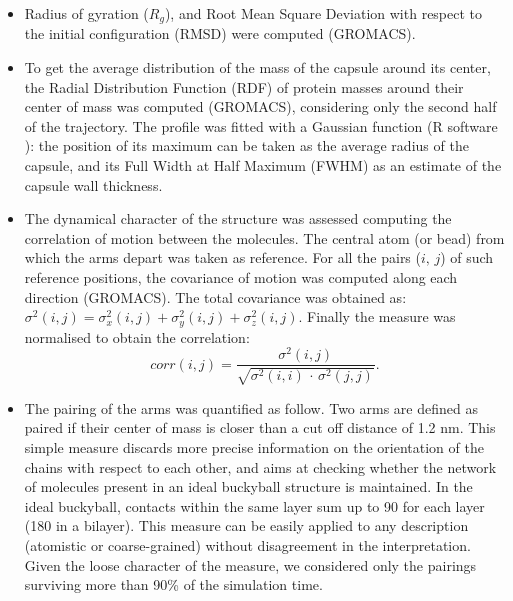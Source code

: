 \begin{itemize}
\item Radius of gyration ($R_g$), and Root Mean Square Deviation with respect to the initial configuration (RMSD) were computed (GROMACS).

\item To get the average distribution of the mass of the capsule around its center, the Radial Distribution Function (RDF) of protein masses around their center of mass was computed (GROMACS), considering only the second half of the trajectory. The profile was fitted with a Gaussian function (R software \citep{R}): the position of its maximum can be taken as the average radius of the capsule, and its Full Width at Half Maximum (FWHM) as an estimate of the capsule wall thickness.

\item The dynamical character of the structure was assessed computing the correlation of motion between the molecules. The central atom (or bead) from which the arms depart was taken as reference. For all the pairs ($i, \, j$) of such reference positions, the covariance of motion was computed along each direction (GROMACS). The total covariance was obtained as: $\sigma^2(i,j) = \sigma_x^2(i,j) + \sigma_y^2(i,j) + \sigma_z^2(i,j)$. Finally the measure was normalised to obtain the correlation:
\begin{equation}
corr(i,j) = \frac{\sigma^2(i,j)}{\sqrt{\sigma^2(i,i)\,\cdot\,\sigma^2(j,j)}}.
\end{equation}

\item The pairing of the arms was quantified as follow. Two arms are defined as paired if their center of mass is closer than a cut off distance of 1.2 nm. This simple measure discards more precise information on the orientation of the chains with respect to each other, and aims at checking whether the network of molecules present in an ideal buckyball structure is maintained. In the ideal buckyball, contacts within the same layer sum up to 90 for each layer (180 in a bilayer). This measure can be easily applied to any description (atomistic or coarse-grained) without disagreement in the interpretation. Given the loose character of the measure, we considered only the pairings surviving more than 90\% of the simulation time.


\end{itemize}
